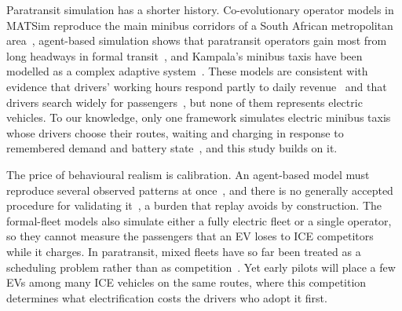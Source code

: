 \documentclass{elsarticle}
\begin{document}
Paratransit simulation has a shorter history. Co-evolutionary operator models in MATSim reproduce the main minibus corridors of a South African metropolitan area~\cite{neumann2015_towards_mbt_simulation_in_sa}, agent-based simulation shows that paratransit operators gain most from long headways in formal transit~\cite{joubert2020_behavioural_response_of_paratransit}, and Kampala's minibus taxis have been modelled as a complex adaptive system~\cite{ndibatya2021_paratransit_abm_thesis}. These models are consistent with evidence that drivers' working hours respond partly to daily revenue~\cite{schlueter2020_stochastic_mbt_behaviour_prediction} and that drivers search widely for passengers~\cite{ndibatya2021_characterising_mbt_movement}, but none of them represents electric vehicles. To our knowledge, only one framework simulates electric minibus taxis whose drivers choose their routes, waiting and charging in response to remembered demand and battery state~\cite{sello2025_stellenbosch_embt_abm}, and this study builds on it.


The price of behavioural realism is calibration. An agent-based model must reproduce several observed patterns at once~\cite{thiele2014_abm_parameter_estimation}, and there is no generally accepted procedure for validating it~\cite{collins2024_abm_validation_methods}, a burden that replay avoids by construction. The formal-fleet models also simulate either a fully electric fleet or a single operator, so they cannot measure the passengers that an EV loses to ICE competitors while it charges. In paratransit, mixed fleets have so far been treated as a scheduling problem rather than as competition~\cite{pretorius2024_scheduling_mixed_fleets, wust2025_mbt_scheduling}. Yet early pilots will place a few EVs among many ICE vehicles on the same routes, where this competition determines what electrification costs the drivers who adopt it first.

\end{document}
